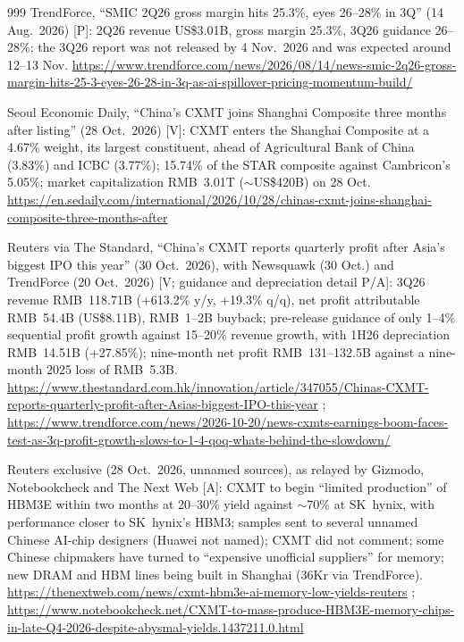 \begin{thebibliography}{999}
 TrendForce, ``SMIC 2Q26 gross margin hits 25.3\%, eyes 26--28\% in 3Q'' (14 Aug.\ 2026) [P]: 2Q26 revenue US\$3.01B, gross margin 25.3\%, 3Q26 guidance 26--28\%; the 3Q26 report was not released by 4 Nov.\ 2026 and was expected around 12--13 Nov. \url{https://www.trendforce.com/news/2026/08/14/news-smic-2q26-gross-margin-hits-25-3-eyes-26-28-in-3q-as-ai-spillover-pricing-momentum-build/}

 Seoul Economic Daily, ``China's CXMT joins Shanghai Composite three months after listing'' (28 Oct.\ 2026) [V]: CXMT enters the Shanghai Composite at a 4.67\% weight, its largest constituent, ahead of Agricultural Bank of China (3.83\%) and ICBC (3.77\%); 15.74\% of the STAR composite against Cambricon's 5.05\%; market capitalization RMB~3.01T ($\sim$US\$420B) on 28 Oct. \url{https://en.sedaily.com/international/2026/10/28/chinas-cxmt-joins-shanghai-composite-three-months-after}

 Reuters via The Standard, ``China's CXMT reports quarterly profit after Asia's biggest IPO this year'' (30 Oct.\ 2026), with Newsquawk (30 Oct.) and TrendForce (20 Oct.\ 2026) [V; guidance and depreciation detail P/A]: 3Q26 revenue RMB~118.71B (+613.2\% y/y, +19.3\% q/q), net profit attributable RMB~54.4B (US\$8.11B), RMB~1--2B buyback; pre-release guidance of only 1--4\% sequential profit growth against 15--20\% revenue growth, with 1H26 depreciation RMB~14.51B (+27.85\%); nine-month net profit RMB~131--132.5B against a nine-month 2025 loss of RMB~5.3B. \url{https://www.thestandard.com.hk/innovation/article/347055/Chinas-CXMT-reports-quarterly-profit-after-Asias-biggest-IPO-this-year} ; \url{https://www.trendforce.com/news/2026-10-20/news-cxmts-earnings-boom-faces-test-as-3q-profit-growth-slows-to-1-4-qoq-whats-behind-the-slowdown/}

 Reuters exclusive (28 Oct.\ 2026, unnamed sources), as relayed by Gizmodo, Notebookcheck and The Next Web [A]: CXMT to begin ``limited production'' of HBM3E within two months at 20--30\% yield against $\sim$70\% at SK~hynix, with performance closer to SK~hynix's HBM3; samples sent to several unnamed Chinese AI-chip designers (Huawei not named); CXMT did not comment; some Chinese chipmakers have turned to ``expensive unofficial suppliers'' for memory; new DRAM and HBM lines being built in Shanghai (36Kr via TrendForce). \url{https://thenextweb.com/news/cxmt-hbm3e-ai-memory-low-yields-reuters} ; \url{https://www.notebookcheck.net/CXMT-to-mass-produce-HBM3E-memory-chips-in-late-Q4-2026-despite-abysmal-yields.1437211.0.html}


\end{thebibliography}
